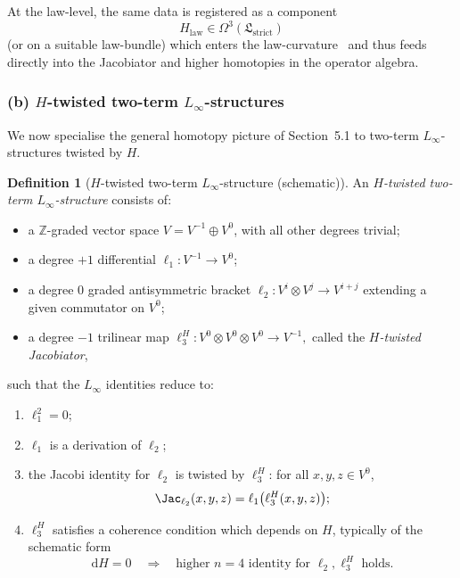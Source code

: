 \documentclass[11pt]{book}
\theoremstyle{plain}
\theoremstyle{definition}
\newtheorem{definition}[theorem]{Definition} \theoremstyle{remark}
\begin{document}
At the law-level, the same data is registered as a component
\[
   H_{\mathrm{law}}
   \in
   \Omega^3(\mathfrak{L}_{\mathrm{strict}})
\]
(or on a suitable law-bundle) which enters the law-curvature
\GZLCurv\ and thus feeds directly into the Jacobiator and higher
homotopies in the operator algebra.



\subsubsection*{(b) $H$-twisted two-term $L_\infty$-structures}

We now specialise the general homotopy picture of Section~5.1 to
two-term $L_\infty$-structures twisted by $H$.

\begin{definition}[$H$-twisted two-term $L_\infty$-structure (schematic)]
An \emph{$H$-twisted two-term $L_\infty$-structure} consists of:
  \begin{itemize}
    \item a $\mathbb{Z}$-graded vector space
          \(
             V = V^{-1}\oplus V^0
          \),
          with all other degrees trivial;
    \item a degree $+1$ differential
          \(
             \ell_1:V^{-1}\to V^0
          \);
    \item a degree $0$ graded antisymmetric bracket
          \(
             \ell_2:V^i\otimes V^j\to V^{i+j}
          \)
          extending a given commutator on $V^0$;
    \item a degree $-1$ trilinear map
          \(
             \ell_3^H:V^0\otimes V^0\otimes V^0\to V^{-1},
          \)
          called the \emph{$H$-twisted Jacobiator},
  \end{itemize}
  such that the $L_\infty$ identities reduce to:
  \begin{enumerate}[label=\roman*)]
    \item $\ell_1^2=0$;
    \item $\ell_1$ is a derivation of $\ell_2$;
    \item the Jacobi identity for $\ell_2$ is twisted by $\ell_3^H$:
          for all $x,y,z\in V^0$,
          \[
             \Jac_{\ell_2}(x,y,z)
             =
             \ell_1\bigl(\ell_3^H(x,y,z)\bigr);
          \]
    \item $\ell_3^H$ satisfies a coherence condition which depends on
          $H$, typically of the schematic form
          \[
             \mathrm{d}H = 0
             \quad\Longrightarrow\quad
             \text{higher } n=4 \text{ identity for }
             \ell_2,\ell_3^H \text{ holds.}
          \]
  \end{enumerate}
\end{definition}
\end{document}

